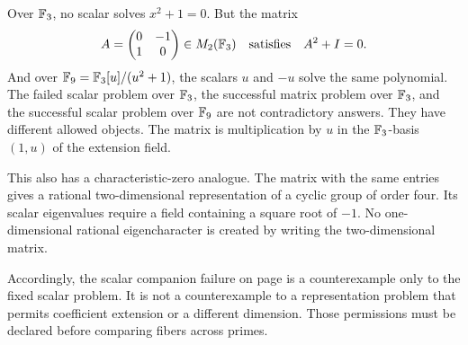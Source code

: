 Over $\mathbb F_3$, no scalar solves $x^2+1=0$. But the matrix
\[
A=\begin{pmatrix}0&-1\\1&0\end{pmatrix}\in M_2(\mathbb F_3)
\quad\text{satisfies}\quad A^2+I=0.
\]
And over $\mathbb F_9=\mathbb F_3[u]/(u^2+1)$, the scalars $u$ and $-u$ solve the same polynomial.
The failed scalar problem over $\mathbb F_3$, the successful matrix problem over $\mathbb F_3$, and the successful scalar problem over $\mathbb F_9$ are not contradictory answers. They have different allowed objects. The matrix is multiplication by $u$ in the $\mathbb F_3$-basis $(1,u)$ of the extension field.

This also has a characteristic-zero analogue. The matrix with the same entries gives a rational two-dimensional representation of a cyclic group of order four. Its scalar eigenvalues require a field containing a square root of $-1$. No one-dimensional rational eigencharacter is created by writing the two-dimensional matrix.

Accordingly, the scalar companion failure on page  is a counterexample only to the fixed scalar problem. It is not a counterexample to a representation problem that permits coefficient extension or a different dimension. Those permissions must be declared before comparing fibers across primes.

